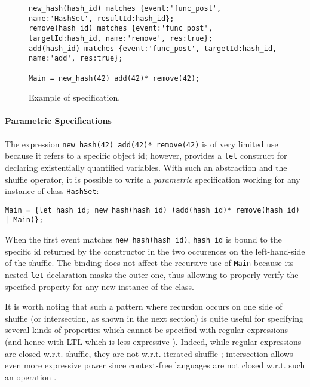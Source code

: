 \begin{figure}[h]
\begin{lstlisting}[basicstyle=\ttfamily\footnotesize]
new_hash(hash_id) matches {event:'func_post', name:'HashSet', resultId:hash_id};
remove(hash_id) matches {event:'func_post', targetId:hash_id, name:'remove', res:true};
add(hash_id) matches {event:'func_post', targetId:hash_id, name:'add', res:true};

Main = new_hash(42) add(42)* remove(42);
\end{lstlisting}
\caption{Example of specification.}\label{example}
\end{figure}

\paragraph{Parametric Specifications}
The expression \lstinline{new_hash(42) add(42)* remove(42)} is of very limited use because it refers to a specific object id;
however, \rml provides a \lstinline{let} construct \cite{AnconaFM17} for declaring existentially quantified variables.
With such an abstraction and the shuffle operator, it is possible to write a \emph{parametric} specification working for any instance of class \lstinline{HashSet}:
\begin{lstlisting}[basicstyle=\ttfamily\footnotesize]
Main = {let hash_id; new_hash(hash_id) (add(hash_id)* remove(hash_id) | Main)};
\end{lstlisting}
When the first event matches \lstinline{new_hash(hash_id)}, \lstinline{hash_id} is bound to the specific id returned by the constructor in the two
occurences on the left-hand-side of the shuffle. The binding does not affect the recursive use of \lstinline{Main}
because its nested \lstinline{let} declaration masks the outer one, thus allowing to properly verify the specified property
for any new instance of the class.

It is worth noting that such a pattern where recursion occurs on one side of shuffle (or intersection, as shown in the next section)
is quite useful for specifying several kinds of properties \cite{RML2021} which cannot be specified with regular expressions (and hence
with LTL which is less expressive \cite{Strejcek2004}). Indeed, while regular expressions are closed w.r.t. shuffle, they are not
w.r.t. iterated shuffle \cite{FlickK12}; intersection allows even more expressive power since context-free languages are not closed w.r.t. such an operation \cite{RML2021}.

